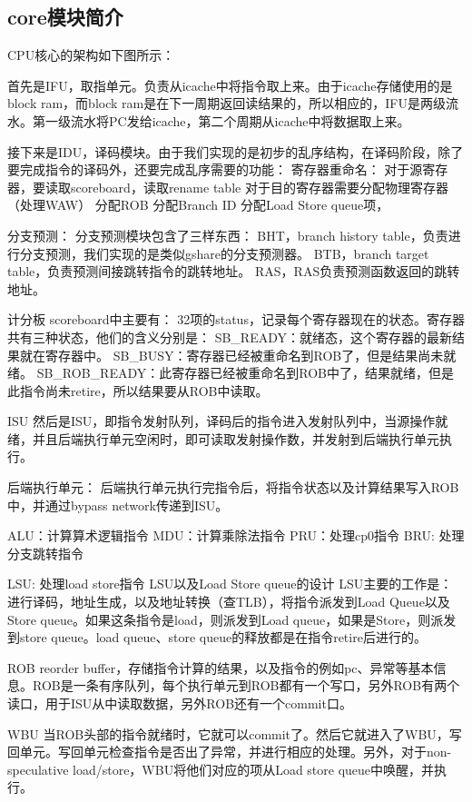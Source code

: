 \documentclass[lang=cn,11pt,a4paper]{elegantpaper}
\begin{document}
\subsection{core模块简介}

CPU核心的架构如下图所示：

首先是IFU，取指单元。负责从icache中将指令取上来。由于icache存储使用的是block ram，而block ram是在下一周期返回读结果的，所以相应的，IFU是两级流水。第一级流水将PC发给icache，第二个周期从icache中将数据取上来。

接下来是IDU，译码模块。由于我们实现的是初步的乱序结构，在译码阶段，除了要完成指令的译码外，还要完成乱序需要的功能：
寄存器重命名：
对于源寄存器，要读取scoreboard，读取rename table
对于目的寄存器需要分配物理寄存器（处理WAW）
分配ROB
分配Branch ID
分配Load Store queue项，

分支预测：
分支预测模块包含了三样东西：
BHT，branch history table，负责进行分支预测，我们实现的是类似gshare的分支预测器。
BTB，branch target table，负责预测间接跳转指令的跳转地址。
RAS，RAS负责预测函数返回的跳转地址。

计分板
scoreboard中主要有：
32项的status，记录每个寄存器现在的状态。寄存器共有三种状态，他们的含义分别是：
SB\_READY：就绪态，这个寄存器的最新结果就在寄存器中。
SB\_BUSY：寄存器已经被重命名到ROB了，但是结果尚未就绪。
SB\_ROB\_READY：此寄存器已经被重命名到ROB中了，结果就绪，但是此指令尚未retire，所以结果要从ROB中读取。

ISU
然后是ISU，即指令发射队列，译码后的指令进入发射队列中，当源操作就绪，并且后端执行单元空闲时，即可读取发射操作数，并发射到后端执行单元执行。


后端执行单元：
后端执行单元执行完指令后，将指令状态以及计算结果写入ROB中，并通过bypass network传递到ISU。

ALU：计算算术逻辑指令
MDU：计算乘除法指令
PRU：处理cp0指令
BRU: 处理分支跳转指令

LSU: 处理load store指令
LSU以及Load Store queue的设计
LSU主要的工作是：
进行译码，地址生成，以及地址转换（查TLB），将指令派发到Load Queue以及Store queue。如果这条指令是load，则派发到Load queue，如果是Store，则派发到store queue。load queue、store queue的释放都是在指令retire后进行的。

ROB
reorder buffer，存储指令计算的结果，以及指令的例如pc、异常等基本信息。ROB是一条有序队列，每个执行单元到ROB都有一个写口，另外ROB有两个读口，用于ISU从中读取数据，另外ROB还有一个commit口。

WBU
当ROB头部的指令就绪时，它就可以commit了。然后它就进入了WBU，写回单元。写回单元检查指令是否出了异常，并进行相应的处理。另外，对于non-speculative load/store，WBU将他们对应的项从Load store queue中唤醒，并执行。
\end{document}
